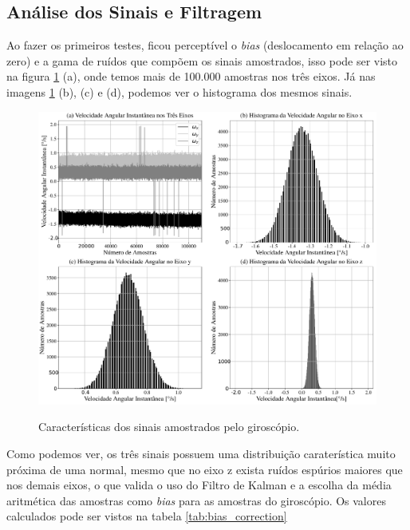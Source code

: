
\subsection{Análise dos Sinais e Filtragem}

Ao fazer os primeiros testes, ficou perceptível o \textit{bias} (deslocamento em relação ao zero) e a gama de ruídos que compõem os sinais amostrados, isso pode ser visto na figura \ref{fig:bias_correction} (a), onde temos mais de 100.000 amostras nos três eixos. Já nas imagens \ref{fig:bias_correction} (b), (c) e (d), podemos ver o histograma dos mesmos sinais.

\begin{figure}[H]
  \caption{Características dos sinais amostrados pelo giroscópio.}
      \includegraphics[scale=.4]{metodologia/img/bias_correction}
  \label{fig:bias_correction}
\end{figure}

Como podemos ver, os três sinais possuem uma distribuição caraterística muito próxima de uma normal, mesmo que no eixo z exista ruídos espúrios maiores que nos demais eixos, o que valida o uso do Filtro de Kalman e a escolha da média aritmética das amostras como \textit{bias} para as amostras do giroscópio. Os valores calculados pode ser vistos na tabela \ref{tab:bias_correction} 


